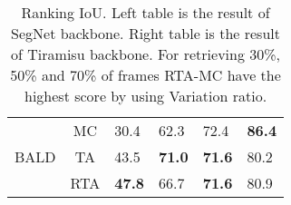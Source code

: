 \begin{table}[t]
\begin{minipage}{.5\textwidth}
\begin{tabular}{ccllll}
\multirow{3}{*}{BALD}            & MC                      & 30.4            & 62.3                     & 72.4            & \textbf{86.4}            \\
                                 & TA                      & 43.5                     & \textbf{71.0}                     & \textbf{71.6}
                                & 80.2                     \\
                                 & RTA                     & \textbf{47.8}                     & 66.7            & \textbf{71.6}                     & 80.9                      \\ \hline
\end{tabular}
  
  \centering
\label{table.rankingIOU_tiramisu}
\end{minipage}
\small \caption{\small Ranking IoU. Left table is the result of SegNet backbone. Right table is the result of Tiramisu backbone. For retrieving 30\%, 50\% and 70\% of frames RTA-MC have the highest score by using Variation ratio.}
\label{table.rankingIOU}
\end{table}


































